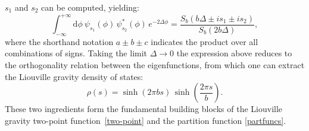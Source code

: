 \documentclass[a4paper,titlepage,12pt]{article}
\numberwithin{equation}{section}
\begin{document}
$s_1$ and $s_2$ 
can be computed, yielding:
\begin{equation}\label{matrix}
\int_{-\infty}^{+\infty} \mathrm{d}\phi \ \psi_{s_1}(\phi)\, \psi_{s_2}^*(\phi)\, e^{-2 \Delta \phi} = \frac{S_b(b \Delta \pm i s_1 \pm i s_2)}{S_b(2b \Delta)},
\end{equation}
where the shorthand notation $a \pm b \pm c$ indicates the product over all combinations of signs. Taking the limit $\Delta \to 0$ the expression above reduces to the orthogonality relation between the eigenfunctions, from which one can extract the Liouville gravity density of states:
\begin{equation}
\label{spectral}
\rho(s) = \sinh(2\pi b s)\, \sinh\left(\frac{2\pi s}{b}\right).
\end{equation}
These two ingredients form the fundamental building blocks of the Liouville gravity two-point function~\eqref{two-point} and the partition function \eqref{partfuncs}.
\end{document}

